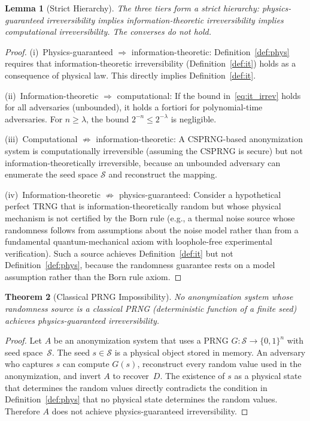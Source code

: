 \documentclass[journal]{IEEEtran}
\newtheorem{theorem}{Theorem}
\newtheorem{lemma}[theorem]{Lemma}
\begin{document}
\begin{lemma}[Strict Hierarchy]
\label{lem:hierarchy}
The three tiers form a strict hierarchy: physics-guaranteed irreversibility implies information-theoretic irreversibility implies computational irreversibility. The converses do not hold.
\end{lemma}

\begin{proof}
(i)~Physics-guaranteed $\Rightarrow$ information-theoretic: Definition~\ref{def:phys} requires that information-theoretic irreversibility (Definition~\ref{def:it}) holds as a consequence of physical law. This directly implies Definition~\ref{def:it}.

(ii)~Information-theoretic $\Rightarrow$ computational: If the bound in~\eqref{eq:it_irrev} holds for all adversaries (unbounded), it holds a fortiori for polynomial-time adversaries. For $n \geq \lambda$, the bound $2^{-n} \leq 2^{-\lambda}$ is negligible.

(iii)~Computational $\not\Rightarrow$ information-theoretic: A CSPRNG-based anonymization system is computationally irreversible (assuming the CSPRNG is secure) but not information-theoretically irreversible, because an unbounded adversary can enumerate the seed space $\mathcal{S}$ and reconstruct the mapping.

(iv)~Information-theoretic $\not\Rightarrow$ physics-guaranteed: Consider a hypothetical perfect TRNG that is information-theoretically random but whose physical mechanism is not certified by the Born rule (e.g., a thermal noise source whose randomness follows from assumptions about the noise model rather than from a fundamental quantum-mechanical axiom with loophole-free experimental verification). Such a source achieves Definition~\ref{def:it} but not Definition~\ref{def:phys}, because the randomness guarantee rests on a model assumption rather than the Born rule axiom.
\end{proof}

\begin{theorem}[Classical PRNG Impossibility]
\label{thm:prng_impossible}
No anonymization system whose randomness source is a classical PRNG (deterministic function of a finite seed) achieves physics-guaranteed irreversibility.
\end{theorem}

\begin{proof}
Let $A$ be an anonymization system that uses a PRNG $G\colon \mathcal{S} \to \{0,1\}^n$ with seed space~$\mathcal{S}$. The seed $s \in \mathcal{S}$ is a physical object stored in memory. An adversary who captures $s$ can compute $G(s)$, reconstruct every random value used in the anonymization, and invert $A$ to recover~$D$. The existence of $s$ as a physical state that determines the random values directly contradicts the condition in Definition~\ref{def:phys} that no physical state determines the random values. Therefore $A$ does not achieve physics-guaranteed irreversibility.
\end{proof}
\end{document}
